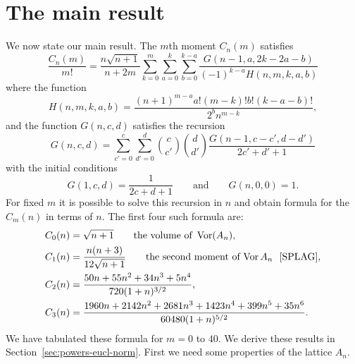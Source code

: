 \documentclass[draftcls, onecolumn, 11pt]{IEEEtran}
\begin{document}
\section{The main result}\label{sec:main-result}

We now state our main result.  The $m$th moment $C_n(m)$ satisfies
\begin{equation}\label{eq:theCmformula}
\frac{C_n(m)}{m!} = \frac{n\sqrt{n+1}}{n+2m}\sum_{k=0}^{m}\sum_{a =0}^{k}\sum_{b=0}^{k-a} \frac{G(n-1,a,2k - 2a - b)}{(-1)^{k-a}H(n,m,k,a,b)} 
\end{equation}
where the function
\[
H(n,m,k,a,b) = \frac{(n+1)^{m-a}a!(m-k)!b! (k-a-b)!}{2^{b} n^{m-k}},
\]
and the function $G(n,c,d)$ satisfies the recursion
\begin{equation}\label{eq:theGrecursion}
G(n,c,d) = \sum_{c'=0}^{c} \sum_{d'=0}^{d} \binom{c}{c'}\binom{d}{d'} \frac{G(n-1,c-c',d-d')}{2c'+d'+1}
\end{equation}
with the initial conditions
\[
G(1,c,d) = \frac{1}{2c+d+1} \qquad \text{and} \qquad G(n,0,0) = 1.
\]
For fixed $m$ it is possible to solve this recursion in $n$ and obtain formula for the $C_m(n)$ in terms of $n$.  The first four such formula are:
\begin{align*}
C_0(n) &= \sqrt{n+1} \qquad \text{the volume of } \vor(A_n),\\
C_1(n) &= \frac{n(n+3)}{12\sqrt{n+1}} \qquad \text{the second moment of $\vor{A_n}$~ \cite[p. 462]{SPLAG}}, \\
C_2(n) &=  \frac{50 n + 55 n^2 + 34 n^3 + 5 n^4}{720 (1 + n)^{3/2}}, \\
C_3(n) &= \frac{1960 n + 2142 n^2 + 2681 n^3 + 1423 n^4 + 399 n^5 + 35 n^6}{60480 (1 + n)^{5/2}}.
\end{align*}
We have tabulated these formula for $m=0$ to $40$.  We derive these results in Section~\ref{sec:powers-eucl-norm}.  First we need some properties of the lattice $A_n$.
\end{document}
